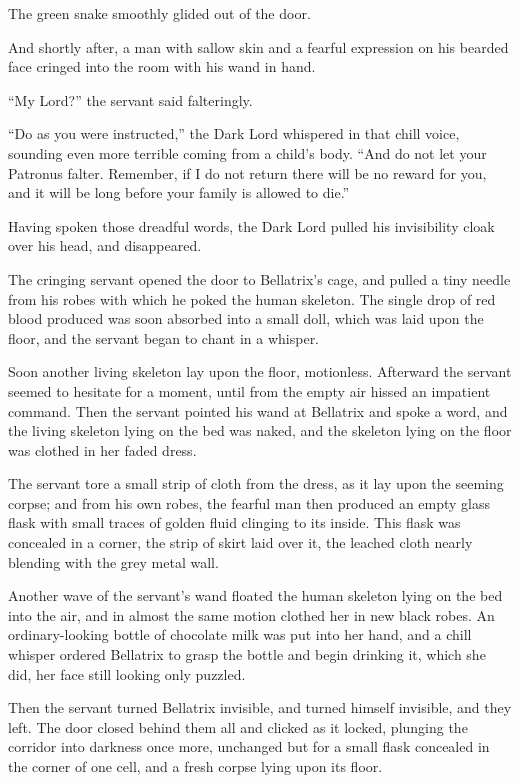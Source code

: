 The green snake smoothly glided out of the door.

And shortly after, a man with sallow skin and a fearful expression on his
bearded face cringed into the room with his wand in hand.

“My Lord?” the servant said falteringly.

“Do as you were instructed,” the Dark Lord whispered in that chill voice,
sounding even more terrible coming from a child’s body. “And do not let your
Patronus falter. Remember, if I do not return there will be no reward for you,
and it will be long before your family is allowed to die.”

Having spoken those dreadful words, the Dark Lord pulled his invisibility cloak
over his head, and disappeared.

The cringing servant opened the door to Bellatrix’s cage, and pulled a tiny
needle from his robes with which he poked the human skeleton. The single drop
of red blood produced was soon absorbed into a small doll, which was laid upon
the floor, and the servant began to chant in a whisper.

Soon another living skeleton lay upon the floor, motionless. Afterward the
servant seemed to hesitate for a moment, until from the empty air hissed an
impatient command. Then the servant pointed his wand at Bellatrix and spoke a
word, and the living skeleton lying on the bed was naked, and the skeleton
lying on the floor was clothed in her faded dress.

The servant tore a small strip of cloth from the dress, as it lay upon the
seeming corpse; and from his own robes, the fearful man then produced an empty
glass flask with small traces of golden fluid clinging to its inside. This
flask was concealed in a corner, the strip of skirt laid over it, the leached
cloth nearly blending with the grey metal wall.

Another wave of the servant’s wand floated the human skeleton lying on the bed
into the air, and in almost the same motion clothed her in new black robes. An
ordinary-looking bottle of chocolate milk was put into her hand, and a chill
whisper ordered Bellatrix to grasp the bottle and begin drinking it, which she
did, her face still looking only puzzled.

Then the servant turned Bellatrix invisible, and turned himself invisible, and
they left. The door closed behind them all and clicked as it locked, plunging
the corridor into darkness once more, unchanged but for a small flask concealed
in the corner of one cell, and a fresh corpse lying upon its floor.

